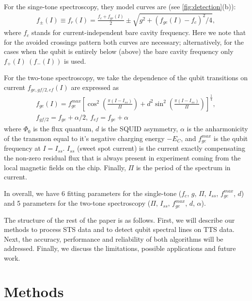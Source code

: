 \documentclass[%
 aip,
 amsmath,amssymb,
 reprint,%
]{revtex4-1}
\begin{document}
For the singe-tone spectroscopy, they model curves are (see \autoref{fig:detection}(b)):
\begin{align}
f_\pm(I) \equiv f_r(I) = \frac{f_c + f_{ge}(I)}{2} \pm \sqrt{g^2+(f_{ge}(I) - f_c)^2/4},\label{eq:f_r}
\end{align}
where $f_c$ stands for current-independent bare cavity frequency. Here we note that for the avoided crossings pattern both curves are necessary; alternatively, for the cases when the qubit is entirely below (above) the bare cavity frequency only $ f_+(I)\ \left(f_-(I)\right)$ is used. 

For the two-tone spectroscopy, we take the dependence of the qubit transitions on current $f_{ge, gf/2, ef}(I)$ are expressed as
\begin{equation}
\begin{gathered}
f_{ge}(I) = f_{ge}^{max} \left[\cos^2\left(\frac{\pi(I-I_{ss})}{\Pi}\right)+d^2 \sin^2 \left(\frac{\pi(I-I_{ss})}{\Pi}\right)\right]^\frac{1}{4}, \\
f_{gf/2} = f_{ge} + \alpha/2,\ f_{ef}=f_{ge} + \alpha
\end{gathered}\label{eq:tr_spectrum}
\end{equation}
where $\Phi_0$ is the flux quantum, $d$ is the SQUID asymmetry, $\alpha$ is the anharmonicity of the transmon equal to it's negative charging energy $-E_C$, and $f_{ge}^{max}$ is the qubit frequency at $I = I_{ss}$. $I_{ss}$ (sweet spot current) is the current exactly compensating the non-zero residual flux that is always present in experiment coming from the local magnetic fields on the chip. Finally, $\Pi$ is the period of the spectrum in current.

In overall, we have 6 fitting parameters for the single-tone  ($f_c$, $g$, $\Pi$, $I_{ss}$, $f_{ge}^{max}$, $d$) and  5 parameters for the two-tone spectroscopy ($\Pi$, $I_{ss}$, $f_{ge}^{max}$, $d$, $\alpha$).

The structure of the rest of the paper is as follows. First, we will describe our methods to process STS data and to detect qubit spectral lines on TTS data. Next, the accuracy, performance and reliability of both algorithms will be addressed. Finally, we discuss the limitations, possible applications and future work. 



\section{Methods}
\end{document}
